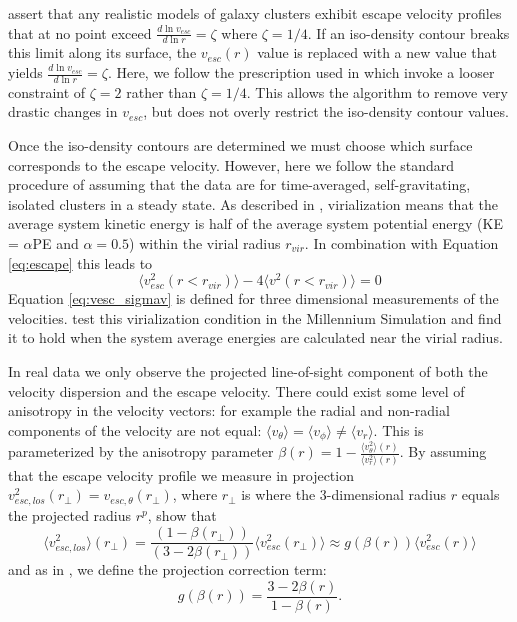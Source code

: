 \documentclass[iop]{emulateapj}
\begin{document}
        \citet{Diaferio99} assert that any realistic models of galaxy clusters exhibit escape velocity profiles that at no point exceed $\frac{d \ln v_{esc}}{d \ln r} = \zeta$ where $\zeta = 1/4$. If an iso-density contour breaks this limit along its surface, the $v_{esc}(r)$ value is replaced with a new value that yields $\frac{d \ln v_{esc}}{d \ln r} = \zeta$. Here, we follow the prescription used in \citet{Serra11} which invoke a looser constraint of $\zeta = 2$ rather than $\zeta = 1/4$. This allows the algorithm to remove very drastic changes in $v_{esc}$, but does not overly restrict the iso-density contour values.
        
        Once the iso-density contours are determined we must choose which surface corresponds to the escape velocity. However, here we follow the standard procedure of assuming that the data are for time-averaged, self-gravitating, isolated clusters in a steady state. As described in \cite{Binney87}, virialization means that the average system kinetic energy is half of the average system potential energy (KE = $\alpha$PE and $\alpha=0.5$) within the virial radius $r_{vir}$. In combination with Equation \ref{eq:escape} this leads to 
        \begin{equation}
        \langle v_{esc}^2(r<r_{vir}) \rangle - 4 \langle v^2(r<r_{vir}) \rangle = 0
        \label{eq:vesc_sigmav}
        \end{equation}
        Equation \ref{eq:vesc_sigmav} is defined for three dimensional measurements of the velocities. \cite{Gifford13b} test this virialization condition in the Millennium Simulation and find it to hold when the system average energies are calculated near the virial radius.
        
    In real data we only observe the projected line-of-sight component of both the velocity dispersion and the escape velocity. There could exist some level of anisotropy in the velocity vectors: for example the radial and non-radial components of the velocity are not equal: $\langle v_{\theta} \rangle  = \langle v_{\phi} \rangle \ne  \langle v_{r} \rangle$. This is parameterized by the anisotropy parameter $\beta(r) = 1 - \frac{\langle v^2_{\theta}\rangle(r)}{\langle v^2_r\rangle(r)}$. By assuming that the escape velocity profile we measure in projection $v_{esc,los}^2(r_{\perp}) = v_{esc,\theta}(r_{\perp})$, where $r_{\perp}$ is where the 3-dimensional radius $r$ equals the projected radius $r^{p}$, \citet{Diaferio99} show that
        \begin{equation}
        \langle v^2_{esc,los}\rangle (r_{\perp}) = \frac{(1-\beta(r_{\perp}))}{(3-2\beta(r_{\perp}))}\langle v_{esc}^2(r_{\perp}) \rangle \approx   g(\beta(r)) \langle v_{esc}^2(r) \rangle
        \label{eq:v_proj}
        \end{equation}
        and as in  \citet{Diaferio99}, we define the projection correction term:
        \begin{equation}
        g(\beta(r)) = \frac{3-2\beta(r)}{1-\beta(r)}.
        \label{eq:gbeta}
        \end{equation}
\end{document}

